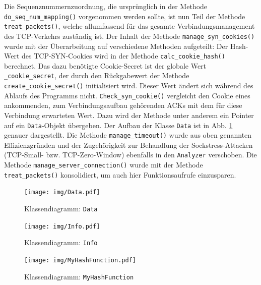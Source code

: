\documentclass[../review_2.tex]{subfiles}
\begin{document}
Die Sequenznummernzuordnung, die ursprünglich in der Methode \texttt{do\_seq\_num\_mapping()} vorgenommen werden sollte, ist nun Teil der Methode \texttt{treat\_packets()}, welche allumfassend für das gesamte Verbindungsmanagement des TCP-Verkehrs zuständig ist.
Der Inhalt der Methode \texttt{manage\_syn\_cookies()} wurde mit der Überarbeitung auf verschiedene Methoden aufgeteilt: Der Hash-Wert des TCP-SYN-Cookies wird in der Methode \texttt{calc\_cookie\_hash()} berechnet. Das dazu benötigte Cookie-Secret ist der globale Wert \texttt{\_cookie\_secret}, der durch den Rückgabewert der Methode \texttt{create\_cookie\_secret()} initialisiert wird. Dieser Wert ändert sich während des Ablaufs des Programms nicht. \texttt{Check\_syn\_cookie()} vergleicht den Cookie eines ankommenden, zum Verbindungsaufbau gehörenden ACKs mit dem für diese Verbindung erwarteten Wert. Dazu wird der Methode unter anderem ein Pointer auf ein \texttt{Data}-Objekt übergeben. Der Aufbau der Klasse \texttt{Data} ist in Abb. \ref{data} genauer dargestellt.
Die Methode \texttt{manage\_timeout()} wurde aus oben genannten Effizienzgründen und der Zugehörigkeit zur Behandlung der Sockstress-Attacken (TCP-Small- bzw. TCP-Zero-Window) ebenfalls in den \texttt{Analyzer} verschoben. 
Die Methode \texttt{manage\_server\_connection()} wurde mit der Methode \texttt{treat\_packets()} konsolidiert, um auch hier Funktionsaufrufe einzusparen.
\begin{figure}[h]
    \centering
    \texttt{[image: img/Data.pdf]}
    \caption{Klassendiagramm: \texttt{Data}}
    \label{data}
\end{figure}

\begin{figure}[h]
    \centering
    \texttt{[image: img/Info.pdf]}
    \caption{Klassendiagramm: \texttt{Info}}
    \label{info}
\end{figure}

\begin{figure}[h]
    \centering
    \texttt{[image: img/MyHashFunction.pdf]}
    \caption{Klassendiagramm: \texttt{MyHashFunction}}
    \label{MyHashFunction}
\end{figure}
\end{document}

